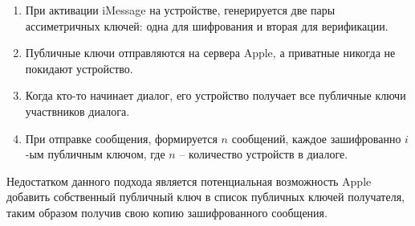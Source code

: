 \begin{enumerate}
	\item При активации iMessage на устройстве, генерируется две пары ассиметричных ключей: одна для шифрования и вторая для верификации.
	\item Публичные ключи отправляются на сервера Apple, а приватные никогда не покидают устройство.
	\item Когда кто-то начинает диалог, его устройство получает все публичные ключи участвников диалога.
	\item При отправке сообщения, формируется \(n\) сообщений, каждое зашифрованно \(i\)-ым публичным ключом, где \(n\) -- количество устройств в диалоге.
\end{enumerate}

Недостатком данного подхода является потенциальная возможность Apple добавить собственный публичный ключ в список публичных ключей получателя, таким образом получив свою копию зашифрованного сообщения.
